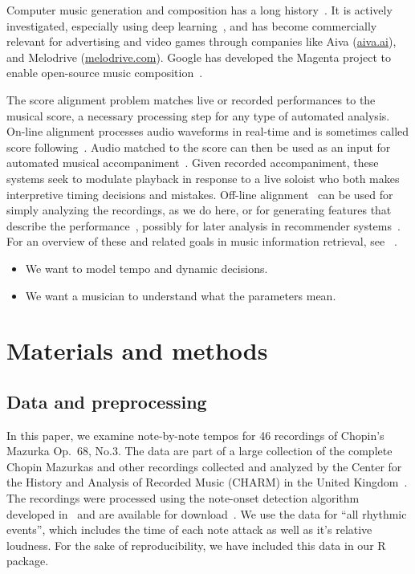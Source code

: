\documentclass[12pt]{article}
\begin{document}
Computer music generation and composition has a long
history~\citep{SturmBen-Tal2019,Boulanger-LewandowskiBengio2012,Collins2016,Ariza2005,FlossmannGrachten2013}.
It is actively investigated, especially using deep
learning~\citep{HadjeresPachet2017}, and has become commercially
relevant for advertising and video games through companies like
Aiva (\url{aiva.ai}), and Melodrive (\url{melodrive.com}). Google has
developed the Magenta project to enable open-source music
composition~\citep{RobertsHawthorne2018}.

The score alignment
problem matches live or recorded performances to the musical score, a necessary
processing step for any type of automated analysis. On-line alignment processes
audio waveforms in real-time 
and is sometimes called score
following~\citep{DannenbergRaphael2006,Cont2010,ContSchwarz2007,ArztWidmer2015}. Audio
matched to the score can then be used as an input for automated
musical accompaniment~\citep{Raphael2010,Vercoe1985,Dannenberg1985}.
Given recorded accompaniment, these systems seek to
modulate playback in response to a live soloist who both makes
interpretive timing decisions and mistakes. Off-line alignment~\citep{Earis2007} can be
used for simply analyzing the recordings, as we do here, or for
generating features that describe the
performance~\citep{ThickstunHarchaoui2017}, possibly for later analysis
in recommender
systems~\citep{McFeeLanckriet2011,OordDieleman2013}. For an overview
of these and related goals in music information retrieval, see
~\citet{schedl2014music}.




\begin{itemize}
\item We want to model tempo and dynamic decisions.
\item We want a musician to understand what the parameters mean.
\end{itemize}



\section{Materials and methods}




\subsection{Data and preprocessing}

In this paper, we examine note-by-note tempos for 46 recordings of
Chopin's Mazurka Op.\ 68, No.3. The data are part of a large
collection of the complete Chopin Mazurkas and other recordings
collected and analyzed by the Center for the History and Analysis of
Recorded Music (CHARM) in the United Kingdom~\citep{CHARM-site}. The
recordings were processed using the note-onset detection algorithm
developed in~\citep{Earis2007} and are available for
download~\citep{Earis2009}. We use the data for ``all rhythmic
events'', which includes the time of each note attack as well as it's
relative loudness. For the sake of reproducibility, we have included
this data in our R package.
\end{document}

